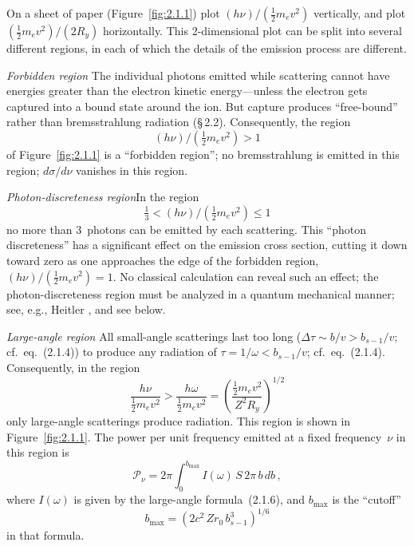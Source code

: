 On a sheet of paper (Figure~\ref{fig:2.1.1}) plot
$(h\nu)/(\tfrac{1}{2}m_e v^{2})$ vertically, and plot
$(\tfrac{1}{2}m_e v^{2})/(2R_y)$ horizontally.  This 2-dimensional plot
can be split into several different regions, in each of which the details
of the emission process are different.

\bigskip
\noindent\textit{Forbidden region}\quad
The individual photons emitted while scattering cannot have energies
greater than the electron kinetic energy---unless the electron gets
captured into a bound state around the ion.  But capture produces
``free-bound'' rather than bremsstrahlung radiation (\S\,2.2).
Consequently, the region
\begin{equation}
  (h\nu)/(\tfrac{1}{2}m_e v^{2}) > 1
  \tag{2.1.9a}
\end{equation}
of Figure~\ref{fig:2.1.1} is a ``forbidden region''; no bremsstrahlung
is emitted in this region; $d\sigma/d\nu$ vanishes in this region.

\bigskip
\noindent\textit{Photon-discreteness region}\quad In the region
\begin{equation}
  \tfrac{1}{3} < (h\nu)/(\tfrac{1}{2}m_e v^{2}) \le 1
  \tag{2.1.9b}
\end{equation}
no more than 3~photons can be emitted by each scattering.  This ``photon
discreteness'' has a significant effect on the emission cross section,
cutting it down toward zero as one approaches the edge of the forbidden
region, $(h\nu)/(\tfrac{1}{2}m_e v^{2}) = 1$.  No classical calculation
can reveal such an effect; the photon-discreteness region must be
analyzed in a quantum mechanical manner; see, e.g., Heitler
\cite{Heitler1954}, and see below.


\bigskip
\noindent\textit{Large-angle region}\quad
All small-angle scatterings last too long
($\Delta\tau \sim b/v > b_{s-1}/v$; cf.\ eq.~(2.1.4)) to produce any
radiation of $\tau = 1/\omega < b_{s-1}/v$; cf.\ eq.~(2.1.4).
Consequently, in the region
\begin{equation}
  \frac{h\nu}{\tfrac{1}{2}m_e v^{2}}
  > \frac{h\omega}{\tfrac{1}{2}m_e v^{2}}
  = \left(\frac{\tfrac{1}{2}m_e v^{2}}{Z^{2}R_y}\right)^{\!1/2}
  \tag{2.1.10}
\end{equation}
only large-angle scatterings produce radiation.  This region is shown in
Figure~\ref{fig:2.1.1}.  The power per unit frequency emitted at a fixed
frequency~$\nu$ in this region is
\begin{equation}
  \mathscr{P}_\nu
  = 2\pi \int_0^{b_{\max}} I(\omega)\,S\,2\pi\,b\,db\,,
  \tag{2.1.11a}
\end{equation}
where $I(\omega)$ is given by the large-angle formula~(2.1.6), and
$b_{\max}$ is the ``cutoff''
\begin{equation}
  b_{\max} = (2c^{2}\,Zr_0\,b_{s-1}^{3})^{1/6}
  \tag{2.1.11b}
\end{equation}
in that formula.

